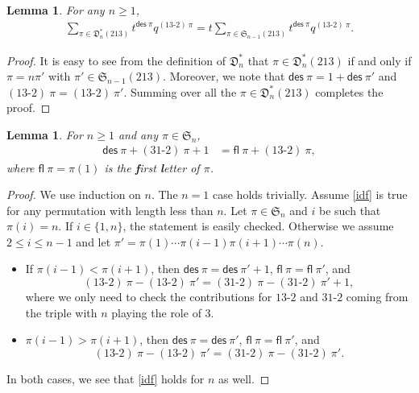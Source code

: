 \documentclass[12pt,reqno]{amsart}
\numberwithin{equation}{section}
\theoremstyle{plain}
\newtheorem{lemma}[theorem]{Lemma}
\theoremstyle{definition}
\def\S{\mathfrak{S}}
\def\D{\mathfrak{D}}
\def\des{\mathsf{des}}
\def\cab{31\text{-}2}
\def\acb{13\text{-}2}
\def\fl{\mathsf{fl}}
\begin{document}
\begin{lemma}\label{D*213=nS213}
For any $n\ge 1$,
\begin{align*}
\sum_{\pi\in\D^*_n(213)}t^{\des\:\pi}q^{(\acb)\:\pi}=t\sum_{\pi\in\S_{n-1}(213)}t^{\des\:\pi}q^{(\acb)\:\pi}.
\end{align*}
\end{lemma}
\begin{proof}
It is easy to see from the definition of $\D^*_n$ that $\pi\in\D^*_n(213)$ if and only if $\pi=n\pi'$ with $\pi'\in\S_{n-1}(213)$. Moreover, we note that $\des\:\pi=1+\des\:\pi'$ and $(\acb)\:\pi=(\acb)\:\pi'$. Summing over all the $\pi\in\D^*_n(213)$ completes the proof.
\end{proof}

\begin{lemma}
For $n\ge 1$ and any $\pi\in\S_n$,
\begin{align}\label{idf}
\des\:\pi+(\cab)\:\pi+1 &= \fl\:\pi+(\acb)\:\pi,
\end{align}
where $\fl\:\pi=\pi(1)$ is the {\bf f}irst {\bf l}etter of $\pi$.
\end{lemma}
\begin{proof}
We use induction on $n$. The $n=1$ case holds trivially. Assume \eqref{idf} is true for any permutation with length less than $n$. Let $\pi\in\S_n$ and $i$ be such that $\pi(i)=n$. If $i\in\{1, n\}$, the statement is easily checked. Otherwise we assume $2\le i \le n-1$ and let $\pi'=\pi(1)\cdots\pi(i-1)\pi(i+1)\cdots\pi(n)$.
\begin{itemize}
	\item If $\pi(i-1)<\pi(i+1)$, then $\des\:\pi=\des\:\pi'+1$, $\fl\:\pi=\fl\:\pi'$, and $$(\acb)\:\pi-(\acb)\:\pi'=(\cab)\:\pi-(\cab)\:\pi'+1,$$ where we only need to check the contributions for $\acb$ and $\cab$ coming from the triple with $n$ playing the role of $3$.
	\item $\pi(i-1)>\pi(i+1)$, then $\des\:\pi=\des\:\pi'$, $\fl\:\pi=\fl\:\pi'$, and $$(\acb)\:\pi-(\acb)\:\pi'=(\cab)\:\pi-(\cab)\:\pi'.$$
\end{itemize}
In both cases, we see that \eqref{idf} holds for $n$ as well.
\end{proof}
\end{document}
